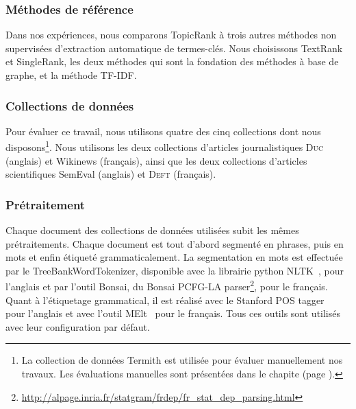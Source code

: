       \subsubsection{Méthodes de référence}
      \label{subsubsec:main-automatic_keyphrase_annotation-unsupervised_automatic_keyphrase_extraction-evaluation-baselines}
        Dans nos expériences, nous comparons TopicRank à trois autres
        méthodes non supervisées d'extraction automatique de termes-clés. Nous
        choisissons TextRank et SingleRank, les deux méthodes qui sont la
        fondation des méthodes à base de graphe, et la méthode TF-IDF.

      \subsubsection{Collections de données}
      \label{subsubsec:main-automatic_keyphrase_annotation-unsupervised_automatic_keyphrase_extraction-evaluation-evaluation_data}
        Pour évaluer ce travail, nous utilisons quatre des cinq collections dont
        nous disposons\footnote{La collection de données Termith est utilisée
        pour évaluer manuellement nos travaux. Les évaluations manuelles sont
        présentées dans le chapite  (page \TODO{}).}. Nous utilisons les
        deux collections d'articles journalistiques \textsc{Duc} (anglais) et
        Wikinews (français), ainsi que les deux collections d'articles
        scientifiques SemEval (anglais) et \textsc{Deft} (français).

      \subsubsection{Prétraitement}
      \label{subsubsec:main-automatic_keyphrase_annotation-unsupervised_automatic_keyphrase_extraction-evaluation-preprocessing}
        Chaque document des collections de données utilisées subit les mêmes
        prétraitements. Chaque document est tout d'abord segmenté en phrases,
        puis en mots et enfin étiqueté grammaticalement. La segmentation en mots
        est effectuée par le TreeBankWordTokenizer, disponible avec la librairie
        python NLTK~\cite[\textit{Natural Language ToolKit}]{bird2009nltk}, pour
        l'anglais et par l'outil Bonsai, du Bonsai PCFG-LA
        parser\footnote{\url{http://alpage.inria.fr/statgram/frdep/fr_stat_dep_parsing.html}},
        pour le français. Quant à l'étiquetage grammatical, il est réalisé avec
        le Stanford POS tagger~\cite{toutanova2003stanfordpostagger} pour
        l'anglais et avec l'outil MElt~\cite{denis2009melt} pour le français.
        Tous ces outils sont utilisés avec leur configuration par défaut.

